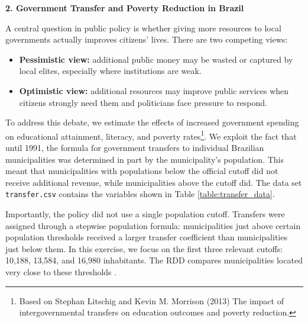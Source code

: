 \documentclass[12pt]{article}
\begin{document}


\begin{center}
    \textbf{\large 2. Government Transfer and Poverty Reduction in Brazil}
\end{center}

A central question in public policy is whether giving more resources to local governments actually improves citizens' lives. There are two competing views:
\begin{itemize}
    \item \textbf{Pessimistic view:} additional public money may be wasted or captured by local elites, especially where institutions are weak.
    \item \textbf{Optimistic view:} additional resources may improve public services when citizens strongly need them and politicians face pressure to respond.
\end{itemize}

To address this debate, we estimate the effects of increased government spending on educational attainment, literacy, and poverty rates\footnote{Based on Stephan Litschig and Kevin M. Morrison (2013) The impact of intergovernmental transfers on education outcomes and poverty reduction.}. 
We exploit the fact that until 1991, the formula for government transfers to individual Brazilian municipalities was determined in part by the municipality’s population. This meant that municipalities with populations below the official cutoff did not receive additional revenue, while municipalities above the cutoff did. The data set \texttt{transfer.csv} contains the variables shown in Table \ref{table:transfer_data}. 

Importantly, the policy did not use a single population cutoff. Transfers were assigned through a stepwise population formula: municipalities just above certain population thresholds received a larger transfer coefficient than municipalities just below them. In this exercise, we focus on the first three relevant cutoffs: 10,188, 13,584, and 16,980 inhabitants. The RDD compares municipalities located very close to these thresholds   .
\end{document}
